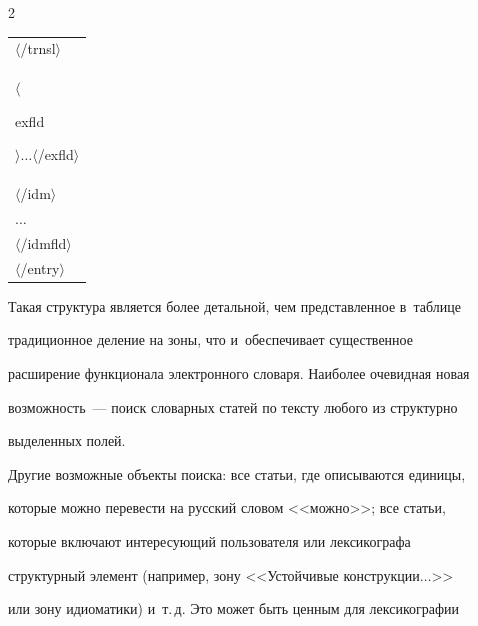 \begin{multicols}{2}
{\begin{tabular}{l}
  \hspace*{6mm}$\langle$/{\sf trnsl}$\rangle$\\


  \hspace*{6mm}$\langle${\sf 


exfld}$\rangle$$\ldots$$\langle$/{\sf exfld}$\rangle$\\


  \hspace*{3mm}$\langle$/{\sf idm}$\rangle$\\


  \hspace*{3mm}$\ldots$\\


  $\langle$/{\sf idmfld}$\rangle$\\


  $\langle$/{\sf entry}$\rangle$


  \end{tabular}


  }


  


  \vspace*{2pt}


  


  Такая структура является более детальной, чем представленное в~таблице 


традиционное деление на зоны, что и~обеспечивает существенное 


расширение функционала электронного словаря. Наиболее очевидная новая 


возможность~--- поиск словарных статей по тексту любого из структурно 


выделенных полей.


{





}


  


  Другие возможные объекты поиска: все статьи, где описываются единицы, 


которые можно перевести на русский словом <<можно>>; все статьи, 


которые включают интересующий пользователя или лексикографа 


структурный элемент (например, зону <<Устойчивые конструкции$\ldots$>> 


или зону идиоматики) и~т.\,д. Это может быть ценным для лексикографии 



\end{multicols}
